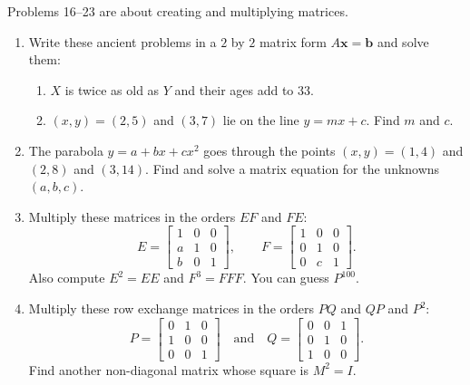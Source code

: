 \documentclass[14pt, a4paper]{article}
\begin{document}
\noindent Problems 16--23 are about creating and multiplying matrices.

\begin{enumerate}[resume]
    \item Write these ancient problems in a $2$ by $2$ matrix form $A\boldsymbol{x} = \boldsymbol{b}$ and solve them:
          \begin{enumerate}
              \item $X$ is twice as old as $Y$ and their ages add to $33$.
              \item $(x,y) = (2,5)$ and $(3,7)$ lie on the line $y = mx + c$. Find $m$ and $c$.
          \end{enumerate}

    \item The parabola $y = a + bx + cx^2$ goes through the points $(x,y) = (1,4)$ and $(2,8)$ and $(3,14)$. Find and solve a matrix equation for the unknowns $(a,b,c)$.

    \item Multiply these matrices in the orders $EF$ and $FE$:
          \[
              E = \begin{bmatrix}
                  1 & 0 & 0 \\
                  a & 1 & 0 \\
                  b & 0 & 1
              \end{bmatrix},
              \qquad
              F = \begin{bmatrix}
                  1 & 0 & 0 \\
                  0 & 1 & 0 \\
                  0 & c & 1
              \end{bmatrix}.
          \]
          Also compute $E^2 = EE$ and $F^3 = FFF$. You can guess $P^{100}$.

    \item Multiply these row exchange matrices in the orders $PQ$ and $QP$ and $P^2$:
          \[
              P = \begin{bmatrix}
                  0 & 1 & 0 \\
                  1 & 0 & 0 \\
                  0 & 0 & 1
              \end{bmatrix}
              \quad\text{and}\quad
              Q = \begin{bmatrix}
                  0 & 0 & 1 \\
                  0 & 1 & 0 \\
                  1 & 0 & 0
              \end{bmatrix}.
          \]
          Find another non-diagonal matrix whose square is $M^2 = I$.


\end{enumerate}
\end{document}
